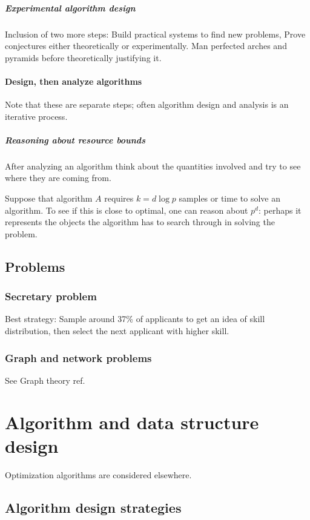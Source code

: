 \documentclass[oneside, article]{memoir}
\begin{document}
\subsubsection{Experimental algorithm design}
Inclusion of two more steps: Build practical systems to find new problems, Prove conjectures either theoretically or experimentally. Man perfected arches and pyramids before theoretically justifying it.

\subsection{Design, then analyze algorithms}
Note that these are separate steps; often algorithm design and analysis is an iterative process.

\subsubsection{Reasoning about resource bounds}
After analyzing an algorithm think about the quantities involved and try to see where they are coming from.

Suppose that algorithm $A$ requires $k = d \log p$ samples or time to solve an algorithm. To see if this is close to optimal, one can reason about $p^{d}$: perhaps it represents the objects the algorithm has to search through in solving the problem.

\chapter{Problems}
\section{Secretary problem}
Best strategy: Sample around 37\% of applicants to get an idea of skill distribution, then select the next applicant with higher skill.

\section{Graph and network problems}
See Graph theory ref.


\part{Algorithm and data structure design}
Optimization algorithms are considered elsewhere.

\chapter{Algorithm design strategies}
\end{document}
